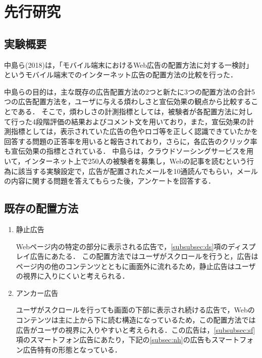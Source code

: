 \documentclass[12pt,a4j,titlepage]{ltjsarticle}
\begin{document}
\clearpage

\section{先行研究}
\subsection{実験概要}
中島ら(2018)は，「モバイル端末におけるWeb広告の配置方法に対する一検討」というモバイル端末でのインターネット広告の配置方法の比較を行った\cite{mobile}．

中島らの目的は，主な既存の広告配置方法の2つと新たに3つの配置方法の合計5つの広告配置方法を，ユーザに与える煩わしさと宣伝効果の観点から比較することである．
そこで，煩わしさの計測指標としては，被験者が各配置方法に対して行った4段階評価の結果およびコメント文を用いており，また，宣伝効果の計測指標としては，表示されていた広告の色やロゴ等を正しく認識できていたかを回答する問題の正答率を用いると報告されており，さらに，各広告のクリック率も宣伝効果の指標とされている．
中島らは，クラウドソーシングサービスを用いて，インターネット上で250人の被験者を募集し，Webの記事を読むという行為に該当する実験設定で，広告が配置されたメールを10通読んでもらい，メールの内容に関する問題を答えてもらった後，アンケートを回答する．

\subsection{既存の配置方法}
\begin{enumerate}
\item 静止広告

Webページ内の特定の部分に表示される広告で，\ref{subsubsec:ds}項のディスプレイ広告にあたる．
この配置方法ではユーザがスクロールを行うと，広告はページ内の他のコンテンツとともに画面外に流れるため，静止広告はユーザの視界に入りにくいと考えられる．

\item アンカー広告

ユーザがスクロールを行っても画面の下部に表示され続ける広告で，Webのコンテンツは主に上から下に読む構造になっているため，この配置方法では広告がユーザの視界に入りやすいと考えられる．この広告は，\ref{subsubsec:sf}項のスマートフォン広告にあたり，下記の\ref{subsec:nh}の広告もスマートフォン広告特有の形態となっている．
\end{enumerate}
\end{document}
